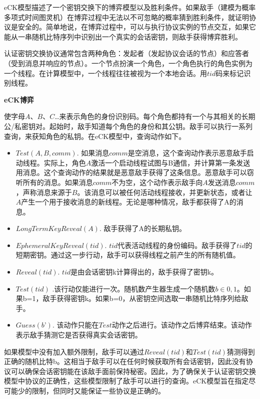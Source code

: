 eCK模型描述了一个密钥交换下的博弈模型以及胜利条件\cite{Bellare1994}。如果敌手（建模为概率多项式时间图灵机）在博弈过程中无法以不可忽略的概率猜到胜利条件，就证明协议是安全的。简单地说，在博弈过程中，可以与执行协议实例的节点交互，如果它能从一串随机比特序列中识别出一个真实的会话密钥，则敌手获得博弈胜利。

认证密钥交换协议通常包含两种角色：发起者（发起协议会话的节点）和应答者（受到消息并响应的节点）。一个节点扮演一个角色，一个角色执行的角色实例为一个线程。在计算模型中，一个线程往往被视为一个本地会话。用$tid$码来标记识别线程。

\textbf{eCK博弈}

使字母$A、B、C$…来表示角色的身份识别码。每个角色都持有一个与其相关的长期公/私密钥对。起始时，敌手知道每个角色的身份和其公钥。敌手可以执行一系列查询，来获知角色的私钥。在eCK模型中，查询动作如下。

\begin{itemize}
\item $Test(A,B,comm)$. 如果消息$comm$是空消息，这个查询动作表示恶意敌手启动线程。实际上，角色$A$激活一个启动线程试图与B通信，并计算第一条发送用消息。这个查询动作的结果就是恶意敌手获得了这条信息。恶意敌手可以窃听所有的消息。如果消息$comm$不为空，这个动作表示敌手向$A$发送消息$comm$，声称消息来源于$B$。该消息可以被任何活动线程接收，并更新状态，或者让$A$产生一个用于接收消息的新线程。无论是哪种情况，敌手都获得了A的消息。
\item	$LongTermKeyReveal(A)$. 敌手获得了A的长期私钥。
\item	$EphemeralKeyReveal(tid)$. $tid$代表活动线程的身份编码。敌手获得了$tid$的短期密钥。通过这一步行动，敌手可以获得线程之前产生的所有随机值。
\item	$Reveal(tid)$. $tid$是由会话密钥k计算得出的，敌手获得了密钥k。
\item	$Test(tid)$ .该行动仅能进行一次。随机数产生器生成一个随机数$b \in {0, 1}$。如果b=1，敌手获得密钥k。如果b=0，从密钥空间选取一串随机比特序列给敌手。
\item	$Guess(b’)$. 该动作只能在$Test$动作之后进行。该动作之后博弈结束。该动作表示敌手猜测它是否获得真实会话密钥。

\end{itemize}

如果模型中没有加入额外限制，敌手可以通过$Reveal(tid)$和$Test(tid)$猜测得到正确的随机比特b。这相当于敌手可以在任何时候获取所有会话密钥，因此没有协议可以确保会话密钥能在该敌手面前保持秘密。因此，为了确保关于认证密钥交换模型中协议的正确性，这些模型限制了敌手可以进行的查询。eCK模型旨在指定尽可能少的限制，但同时又能保证一些协议是正确的。

